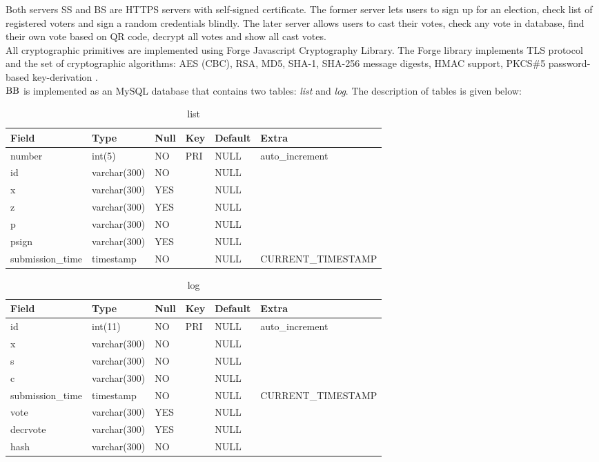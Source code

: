 Both servers SS and BS are HTTPS servers with self-signed certificate. The former server lets users to sign up for an election, check list of registered voters and sign a random credentials blindly. The later server allows users to cast their votes, check any vote in database, find their own vote based on QR code, decrypt all votes and show all cast votes.\\

All cryptographic primitives are implemented using Forge Javascript Cryptography Library. The Forge library implements TLS protocol and the set of cryptographic algorithms: AES (CBC), RSA, MD5, SHA-1, SHA-256 message digests, HMAC support, PKCS\#5 password-based key-derivation \cite{forge}. \\

$\operatorname{BB}$ is implemented as an MySQL database that contains two tables: \textit{list} and \textit{log}. The description of tables is given below:\\

\begin{table}[h!]
\centering
\caption {list}
\begin{tabular}{|l|l|l|l|l|l|}
\hline
 Field & Type&     Null & Key & Default & Extra \\ 
 \hline 
 number &  int(5) & NO   & PRI  & NULL &  auto\_increment \\
id& varchar(300) & NO   &  &  NULL &\\
x& varchar(300) & YES  &  & NULL  & \\
z& varchar(300) & YES  &  & NULL  & \\
p& varchar(300) & NO  &  &  NULL & \\
psign&  varchar(300) & YES  &  & NULL  & \\
submission\_time& timestamp & NO  &  &  NULL & CURRENT\_TIMESTAMP\\
\hline
\end{tabular}
\end{table}
\begin{table}[!htb]
\centering
\caption {log}
\begin{tabular}{|l|l|l|l|l|l|}
\hline
 Field & Type&     Null & Key & Default & Extra \\ 
 \hline 
id &  int(11) & NO   & PRI  & NULL &  auto\_increment \\
x& varchar(300) & NO  &  & NULL  & \\
s& varchar(300) & NO  &  & NULL  & \\
c& varchar(300) & NO  &  & NULL  & \\
submission\_time& timestamp & NO  &  &  NULL & CURRENT\_TIMESTAMP\\
vote&  varchar(300) & YES  &  & NULL  & \\
decrvote&  varchar(300) & YES  &  & NULL  & \\
hash&  varchar(300) & NO  &  & NULL  & \\
\hline
\end{tabular}
\end{table}

